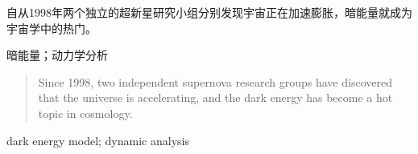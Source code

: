 

\begin{zhaiyao}
自从1998年两个独立的超新星研究小组分别发现宇宙正在加速膨胀，暗能量就成为宇宙学中的热门。
\end{zhaiyao}




\begin{guanjianci}
暗能量；动力学分析
\end{guanjianci}



\begin{abstract}
Since 1998, two independent supernova research groups have discovered that the universe is accelerating, and the dark energy has become a hot topic in cosmology. 

\end{abstract}



\begin{keywords}
dark energy model; dynamic analysis
\end{keywords} 